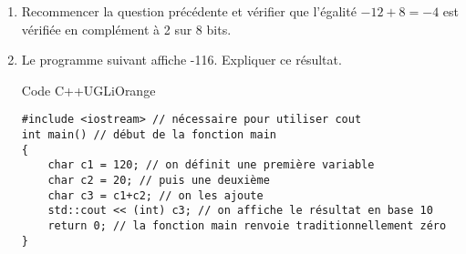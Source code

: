 \documentclass[a4paper,10pt]{book}
\begin{document}
\begin{enumerate}[\bfseries 1.]
\begin{center}
\end{center}
 Ce schéma représente l'encodage des entiers relatifs en complément à 2 sur 8 bits (que l'on retrouve dans le type  en C et C++).\\

	En bleu figurent les nombres tels qu'ils sont stockés dans la mémoire, sur un octet.\\
	En orange figurent les nombres représentés par les nombres bleus :
	\begin{enumerate}[--]
		\item 	lorsqu'il est compris entre 0 et 127, un nombre bleu représente ce même nombre (affiché en vert);
		\item 	lorsqu'il est compris entre 128 et 255, un nombre bleu $p$ représente le nombre $p-256$ (affiché en rouge).
	\end{enumerate}
	\begin{enumerate}[\bfseries a.]
		\item 	Donner la représentation en complément à 2 sur 8 bits du nombre +7.
		\item 	Faire de même avec -3.
		\item 	Ajouter en binaire ces deux représentations (une éventuelle retenue après le 8\eme bit est ignorée), quel nombre cela représente-t-il ?
	\end{enumerate}
	\item  Recommencer la question précédente et vérifier que l'égalité $-12+8=-4$ est vérifiée en complément à 2 sur 8 bits.\\
	\item Le programme suivant affiche -116. Expliquer ce résultat.
\begin{encadrecolore}{Code C++}{UGLiOrange}
	\begin{verbatim}
#include <iostream> // nécessaire pour utiliser cout
int main() // début de la fonction main
{
    char c1 = 120; // on définit une première variable
    char c2 = 20; // puis une deuxième
    char c3 = c1+c2; // on les ajoute
    std::cout << (int) c3; // on affiche le résultat en base 10
    return 0; // la fonction main renvoie traditionnellement zéro
}
	\end{verbatim}


\end{encadrecolore}
\end{enumerate}
\end{document}
